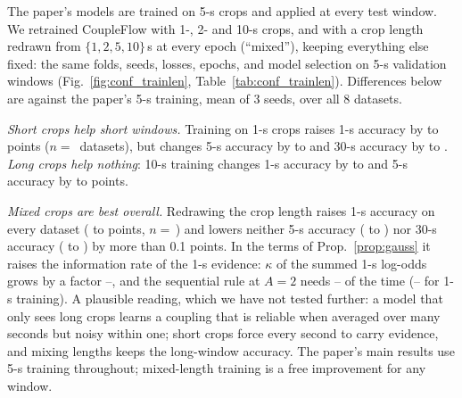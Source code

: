 The paper's models are trained on 5-s crops and applied at every test window. We retrained
CoupleFlow with 1-, 2- and 10-s crops, and with a crop length redrawn from $\{1,2,5,10\}$\,s
at every epoch (``mixed''), keeping everything else fixed: the same folds, seeds, losses,
epochs, and model selection on 5-s validation windows (Fig.~\ref{fig:conf_trainlen},
Table~\ref{tab:conf_trainlen}). Differences below are against the paper's 5-s training, mean of
3 seeds, over all 8 datasets.

\emph{Short crops help short windows.} Training on 1-s crops raises 1-s accuracy by
\confTlOneOneSMin{} to \confTlOneOneSMax{} points ($n=$\,\confTlOneOneSN{} datasets), but
changes 5-s accuracy by \confTlOneFiveSMin{} to \confTlOneFiveSMax{} and 30-s accuracy by
\confTlOneThirtySMin{} to \confTlOneThirtySMax. \emph{Long crops help nothing}: 10-s training
changes 1-s accuracy by \confTlTenOneSMin{} to \confTlTenOneSMax{} and 5-s accuracy by
\confTlTenFiveSMin{} to \confTlTenFiveSMax{} points.

\emph{Mixed crops are best overall.} Redrawing the crop length raises 1-s accuracy on every dataset
(\confTlMixOneSMin{} to \confTlMixOneSMax{} points, $n=$\,\confTlMixOneSN) and lowers neither
5-s accuracy (\confTlMixFiveSMin{} to \confTlMixFiveSMax) nor 30-s accuracy
(\confTlMixThirtySMin{} to \confTlMixThirtySMax) by more than 0.1 points. In the terms of Prop.~\ref{prop:gauss} it raises
the information rate of the 1-s evidence: $\kappa$ of the summed 1-s log-odds grows by a factor
\confTlMixKapMin--\confTlMixKapMax, and the sequential rule at $A{=}2$ needs
\confTlMixTimeMin--\confTlMixTimeMax{} of the time (\confTlOneTimeMin--\confTlOneTimeMax{}
for 1-s training). A plausible reading, which we have not tested further: a model that only sees long crops learns a coupling that is reliable when
averaged over many seconds but noisy within one; short crops force every second to carry
evidence, and mixing lengths keeps the long-window accuracy. The paper's main results use
5-s training throughout; mixed-length training is a free improvement for any window.

